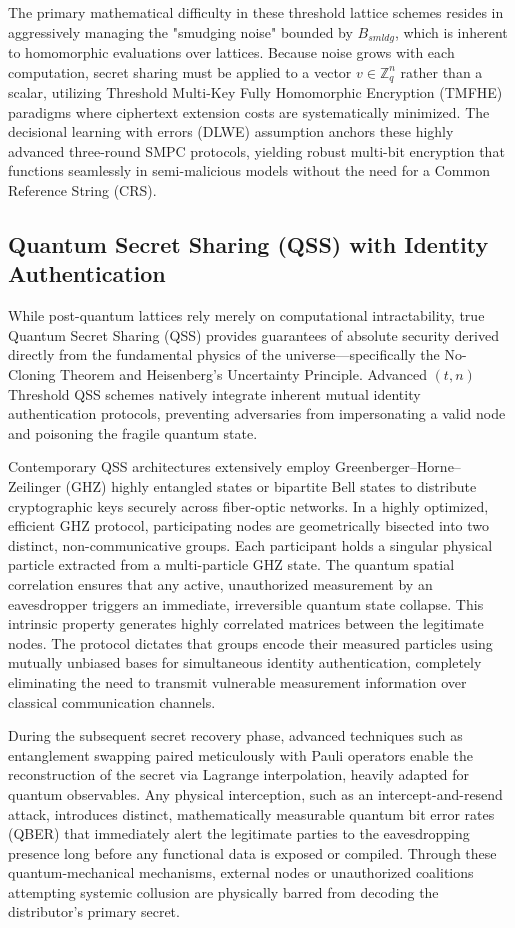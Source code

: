 \documentclass[11pt, a4paper]{article}
\begin{document}
The primary mathematical difficulty in these threshold lattice schemes resides in aggressively managing the "smudging noise" bounded by $B_{smldg}$, which is inherent to homomorphic evaluations over lattices. Because noise grows with each computation, secret sharing must be applied to a vector $v \in \mathbb{Z}_q^n$ rather than a scalar, utilizing Threshold Multi-Key Fully Homomorphic Encryption (TMFHE) paradigms where ciphertext extension costs are systematically minimized. The decisional learning with errors (DLWE) assumption anchors these highly advanced three-round SMPC protocols, yielding robust multi-bit encryption that functions seamlessly in semi-malicious models without the need for a Common Reference String (CRS).

\subsection*{Quantum Secret Sharing (QSS) with Identity Authentication}
While post-quantum lattices rely merely on computational intractability, true Quantum Secret Sharing (QSS) provides guarantees of absolute security derived directly from the fundamental physics of the universe—specifically the No-Cloning Theorem and Heisenberg's Uncertainty Principle. Advanced $(t, n)$ Threshold QSS schemes natively integrate inherent mutual identity authentication protocols, preventing adversaries from impersonating a valid node and poisoning the fragile quantum state.

Contemporary QSS architectures extensively employ Greenberger–Horne–Zeilinger (GHZ) highly entangled states or bipartite Bell states to distribute cryptographic keys securely across fiber-optic networks. In a highly optimized, efficient GHZ protocol, participating nodes are geometrically bisected into two distinct, non-communicative groups. Each participant holds a singular physical particle extracted from a multi-particle GHZ state. The quantum spatial correlation ensures that any active, unauthorized measurement by an eavesdropper triggers an immediate, irreversible quantum state collapse. This intrinsic property generates highly correlated matrices between the legitimate nodes. The protocol dictates that groups encode their measured particles using mutually unbiased bases for simultaneous identity authentication, completely eliminating the need to transmit vulnerable measurement information over classical communication channels.

During the subsequent secret recovery phase, advanced techniques such as entanglement swapping paired meticulously with Pauli operators enable the reconstruction of the secret via Lagrange interpolation, heavily adapted for quantum observables. Any physical interception, such as an intercept-and-resend attack, introduces distinct, mathematically measurable quantum bit error rates (QBER) that immediately alert the legitimate parties to the eavesdropping presence long before any functional data is exposed or compiled. Through these quantum-mechanical mechanisms, external nodes or unauthorized coalitions attempting systemic collusion are physically barred from decoding the distributor's primary secret.
\end{document}
